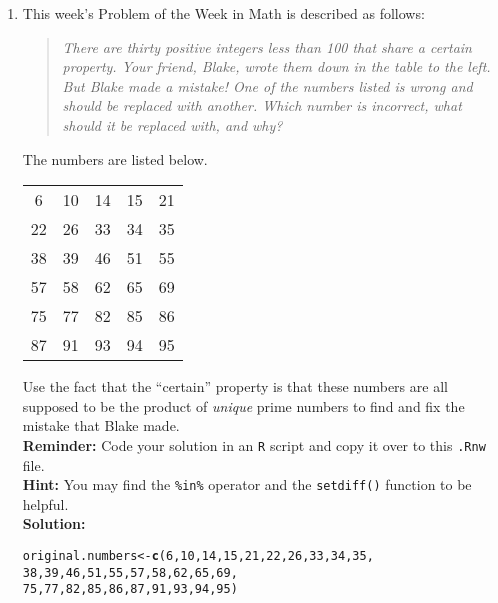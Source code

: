 \documentclass{article}\usepackage[]{graphicx}\usepackage[]{xcolor}
\makeatletter
\newcommand{\hlnum}[1]{\textcolor[rgb]{0.686,0.059,0.569}{#1}}%
\newcommand{\hldef}[1]{\textcolor[rgb]{0.345,0.345,0.345}{#1}}%
\newcommand{\hlkwb}[1]{\textcolor[rgb]{0.69,0.353,0.396}{#1}}%
\newcommand{\hlkwd}[1]{\textcolor[rgb]{0.737,0.353,0.396}{\textbf{#1}}}%
\newenvironment{kframe}{%
 \def\at@end@of@kframe{}%
 \ifinner\ifhmode%
  \def\at@end@of@kframe{\end{minipage}}%
  \begin{minipage}{\columnwidth}%
 \fi\fi%
 \def\FrameCommand##1{\hskip\@totalleftmargin \hskip-\fboxsep
 \colorbox{shadecolor}{##1}\hskip-\fboxsep
     \hskip-\linewidth \hskip-\@totalleftmargin \hskip\columnwidth}%
 \MakeFramed {\advance\hsize-\width
   \@totalleftmargin\z@ \linewidth\hsize
   \@setminipage}}%
 {\par\unskip\endMakeFramed%
 \at@end@of@kframe}
\newenvironment{knitrout}{}{} %
\makeatother
\begin{document}
\begin{enumerate}
\item This week's Problem of the Week in Math is described as follows:
\begin{quotation}
  \textit{There are thirty positive integers less than 100 that share a certain 
  property. Your friend, Blake, wrote them down in the table to the left. But 
  Blake made a mistake! One of the numbers listed is wrong and should be replaced 
  with another. Which number is incorrect, what should it be replaced with, and 
  why?}
\end{quotation}
The numbers are listed below.
\begin{center}
  \begin{tabular}{ccccc}
    6 & 10 & 14 & 15 & 21\\
    22 & 26 & 33 & 34 & 35\\
    38 & 39 & 46 & 51 & 55\\
    57 & 58 & 62 & 65 & 69\\
    75 & 77 & 82 & 85 & 86\\
    87 & 91 & 93 & 94 & 95
  \end{tabular}
\end{center}
Use the fact that the ``certain'' property is that these numbers are all supposed
to be the product of \emph{unique} prime numbers to find and fix the mistake that
Blake made.\\
\textbf{Reminder:} Code your solution in an \texttt{R} script and copy it over
to this \texttt{.Rnw} file.\\
\textbf{Hint:} You may find the \verb|%in%| operator and the \verb|setdiff()| function to be helpful.\\

\textbf{Solution:} 

\begin{knitrout}\scriptsize
{}\color{fgcolor}\begin{kframe}
\begin{alltt}
\hldef{original.numbers} \hlkwb{<-} \hlkwd{c}\hldef{(}\hlnum{6}\hldef{,}\hlnum{10}\hldef{,}\hlnum{14}\hldef{,}\hlnum{15}\hldef{,}\hlnum{21}\hldef{,}\hlnum{22}\hldef{,}\hlnum{26}\hldef{,}\hlnum{33}\hldef{,}\hlnum{34}\hldef{,}\hlnum{35}\hldef{,}
                  \hlnum{38}\hldef{,}\hlnum{39}\hldef{,}\hlnum{46}\hldef{,}\hlnum{51}\hldef{,}\hlnum{55}\hldef{,}\hlnum{57}\hldef{,}\hlnum{58}\hldef{,}\hlnum{62}\hldef{,}\hlnum{65}\hldef{,}\hlnum{69}\hldef{,}
                  \hlnum{75}\hldef{,}\hlnum{77}\hldef{,}\hlnum{82}\hldef{,}\hlnum{85}\hldef{,}\hlnum{86}\hldef{,}\hlnum{87}\hldef{,}\hlnum{91}\hldef{,}\hlnum{93}\hldef{,}\hlnum{94}\hldef{,}\hlnum{95}\hldef{)}


\end{alltt}
\end{kframe}
\end{knitrout}
\end{enumerate}
\end{document}
